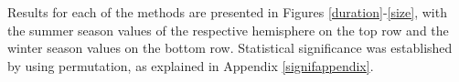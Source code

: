 \documentclass[smallextended]{svjour3}       %
\numberwithin{equation}{section}
\begin{document}
{\color{blue}Results for each of the methods are presented in Figures \ref{duration}-\ref{size}, with the summer season values of the respective hemisphere on the top row and the winter season values on the bottom row. Statistical significance was established by using permutation, as explained in Appendix \ref{signifappendix}.}







\end{document}
